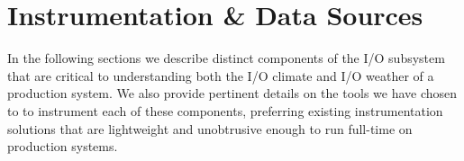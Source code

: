 \section{Instrumentation \& Data Sources} \label{sec:methods}


In the following sections we describe distinct components of the I/O subsystem that are critical to understanding both the I/O climate and I/O weather of a production system.
We also provide pertinent details on the tools we have chosen to to instrument each of these components, preferring existing instrumentation solutions that are lightweight and unobtrusive enough to run full-time on production systems.


